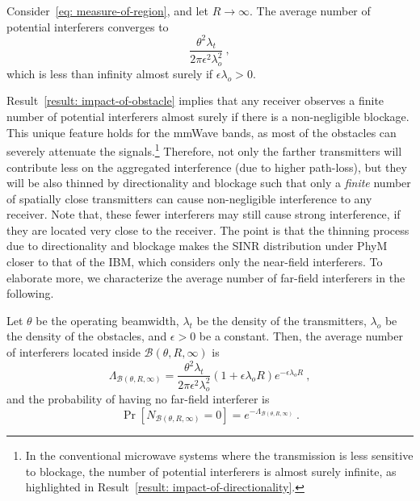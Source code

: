 \documentclass[12pt, draftclsnofoot, onecolumn]{IEEEtran}
\begin{document}
\begin{result}\label{result: impact-of-obstacle}
Consider~\eqref{eq: measure-of-region}, and let ${R \to \infty}$. The average number of potential interferers converges to
\begin{equation}\label{eq: avg-number-interferers}
\frac{\theta^2 \lambda_t}{2\pi \epsilon^{2} \lambda_{o}^{2}} \:,
\end{equation}
which is less than infinity almost surely if $\epsilon\lambda_o > 0$.
\end{result}

Result~\ref{result: impact-of-obstacle} implies that any receiver observes a finite number of potential interferers almost surely if there is a non-negligible blockage. This unique feature holds for the mmWave bands, as most of the obstacles can severely attenuate the signals.\footnote{In the conventional microwave systems where the transmission is less sensitive to blockage, the number of potential interferers is almost surely infinite, as highlighted in Result~\ref{result: impact-of-directionality}.} Therefore, not only the farther transmitters will contribute less on the aggregated interference (due to higher path-loss), but they will be also thinned by directionality and blockage such that only a \emph{finite} number of spatially close transmitters can cause non-negligible interference to any receiver. Note that, these fewer interferers may still cause strong interference, if they are located very close to the receiver. The point is that the thinning process due to directionality and blockage makes the SINR distribution under PhyM closer to that of the IBM, which considers only the near-field interferers. To elaborate more, we characterize the average number of far-field interferers in the following.

\begin{prop}\label{prop: measure-far-field}
Let $\theta$ be the operating beamwidth, $\lambda_t$ be the density of the transmitters, $\lambda_o$ be the density of the obstacles, and $\epsilon>0$ be a constant. Then, the average number of interferers located inside $\mathcal{B}(\theta,R,\infty)$ is
\begin{equation}\label{eq: measure-far-field}
\Lambda_{\mathcal{B}(\theta,R,\infty)} = \frac{\theta^2 \lambda_t}{2\pi \epsilon^{2} \lambda_{o}^{2}} \left( 1 + \epsilon \lambda_o R \right)e^{- \epsilon \lambda_o R} \:,
\end{equation}
and the probability of having no far-field interferer is
\begin{equation}\label{eq: AvgNoPoints-far-field}
\Pr[N_{\mathcal{B}(\theta,R,\infty)}=0] = e^{-\Lambda_{\mathcal{B}(\theta,R,\infty)}} \:.
\end{equation}
\end{prop}
\end{document}
